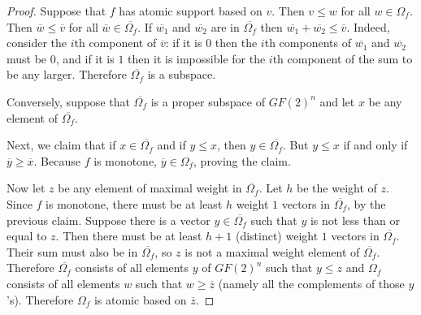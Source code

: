 \documentclass[12pt]{article}
\begin{document}
\begin{proof}
Suppose that $f$ has atomic support based on $v$.
Then $v\leq w$ for all $w \in \Omega_f$.
Then $\overline{w}\leq \overline{v}$ for all $\overline{w} \in
\overline{\Omega_f}$.
If $\overline{w_1}$ and $\overline{w_2}$ are in $\overline{\Omega_f}$
then  $\overline{w_1}+\overline{w_2}\leq \overline{v}$.
Indeed, consider the $i$th component of
$\overline{v}$:  if it is $0$ then the $i$th components of
$\overline{w_1}$ and $\overline{w_2}$
must be $0$, and if it is $1$ then it is impossible for the $i$th
component of the sum to be any larger.  Therefore $\overline{\Omega_f}$ is a subspace.

Conversely, suppose that $\overline{\Omega_f}$ is a proper subspace of $GF(2)^n$ and
let $x$ be any element of $\overline{\Omega_f}$.


Next, we claim that if $x \in \overline{\Omega_f}$ and if $y\leq x$,
then $y \in \overline{\Omega_f}$.
But $y\leq x$ if and only if $\overline{y}\geq \overline{x}$.
Because $f$ is monotone, $\overline{y} \in \Omega_f$, proving the claim.

Now let $z$ be any element of maximal weight in $\overline{\Omega_f}$.
Let $h$ be the weight of $z$. Since $f$ is monotone, there must be at
least $h$ weight $1$ vectors in $\overline{\Omega_f}$, by the
previous claim.
Suppose there is a vector $y \in \overline{\Omega_f}$ such that $y$ is
not less than or equal to $z$.
Then there must be at least $h+1$ (distinct) weight $1$ vectors in
$\overline{\Omega_f}$.
Their sum must also be in $\overline{\Omega_f}$, so $z$ is not a
maximal weight element of $\overline{\Omega_f}$.
Therefore $\overline{\Omega_f}$ consists of all elements $y$ of $GF(2)^n$
such that $y\leq z$ and $\Omega_f$ consists of all elements $w$
such that $w\geq \overline{z}$ (namely all the complements of those $y$'s).
Therefore $\Omega_f$ is atomic based on $\overline{z}$.
\end{proof}
\end{document}
